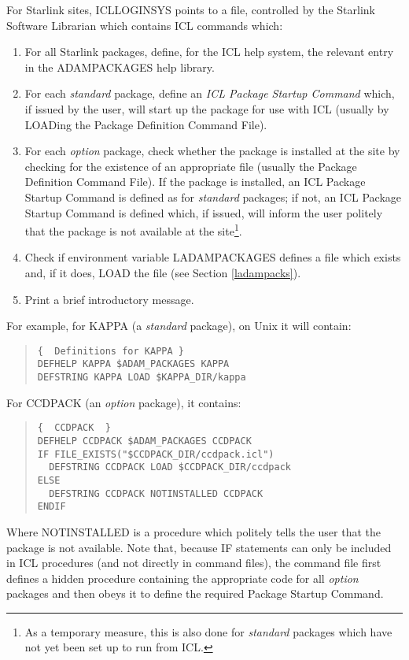 \documentclass[twoside,11pt]{article}
\newcommand{\xref}[3]{#1}
\renewcommand{\_}{\texttt{\symbol{95}}}
\begin{document}
For Starlink sites, ICL\_LOGIN\_SYS points to a file, controlled by the
Starlink Software Librarian which contains ICL commands which:
\begin{enumerate}
\item For all Starlink packages, define, for the ICL
help system, the relevant entry in the ADAM\-\_PACKAGES help library.
\item For each \textit{standard}\/ package, define an
\textit{ICL Package Startup Command} which, if issued by the user, will
start up the package for use with ICL (usually by 
\xref{LOAD}{sg5}{LOAD}ing the Package Definition
Command File).
\item For each \textit{option}\/ package, check whether the package is installed
at the site by checking for the existence of an appropriate file (usually the
Package Definition Command File).
If the package is installed, an ICL Package Startup Command is defined as for
\textit{standard} packages; if not, an ICL Package Startup Command is defined 
which, if issued, will inform the user politely that the package is not 
available at the site\footnote{As a temporary measure, this is also done for 
\textit{standard} packages which have not yet been set up to run from ICL.}.
\item Check if environment variable LADAM\-\_PACKAGES defines a file which
exists and, if it does, 
\xref{LOAD}{sg5}{LOAD} the file (see  Section \ref{ladampacks}).
\item Print a brief introductory message.
\end{enumerate}

For example, for KAPPA (a \textit{standard} package), on Unix it will contain:
\begin{quote}
\begin{verbatim}
{  Definitions for KAPPA }
DEFHELP KAPPA $ADAM_PACKAGES KAPPA
DEFSTRING KAPPA LOAD $KAPPA_DIR/kappa
\end{verbatim}
\end{quote}

For CCDPACK (an \textit{option} package), it contains:
\begin{quote}
\begin{verbatim}
{  CCDPACK  }
DEFHELP CCDPACK $ADAM_PACKAGES CCDPACK
IF FILE_EXISTS("$CCDPACK_DIR/ccdpack.icl") 
  DEFSTRING CCDPACK LOAD $CCDPACK_DIR/ccdpack
ELSE
  DEFSTRING CCDPACK NOTINSTALLED CCDPACK
ENDIF
\end{verbatim}
\end{quote}
Where NOTINSTALLED is a procedure which politely tells the user that the
package is not available.
Note that, because IF statements can only be included in ICL procedures (and not
directly in command files), the command file first defines a hidden procedure
containing the appropriate code for all \textit{option} packages and then obeys
it to define the required Package Startup Command.
\end{document}
